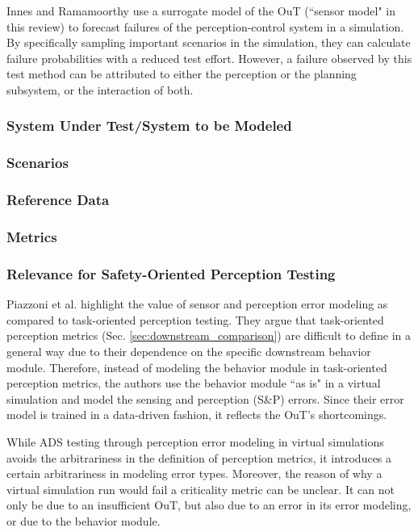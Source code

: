 \documentclass[conference]{IEEEtran}
\begin{document}
Innes and Ramamoorthy \cite{Innes2022testing} use a surrogate model of the OuT (``sensor model" in this review) to forecast failures of the perception-control system in a simulation. 
By specifically sampling important scenarios in the simulation, they can calculate failure probabilities with a reduced test effort. 
However, a failure observed by this test method can be attributed to either the perception or the planning subsystem, or the interaction of both. 


\subsubsection{System Under Test/System to be Modeled}
\subsubsection{Scenarios}


\subsubsection{Reference Data}
\subsubsection{Metrics}

\subsubsection{Relevance for Safety-Oriented Perception Testing}


\mbox{Piazzoni} et al. \cite{Piazzoni2023simulation} highlight the value of sensor and perception error modeling as compared to task-oriented perception testing. 
They argue that task-oriented perception metrics (Sec. \ref{sec:downstream_comparison}) are difficult to define in a general way due to their dependence on the specific downstream behavior module. 
Therefore, instead of modeling the behavior module in task-oriented perception metrics, the authors use the behavior module ``as is" in a virtual simulation and model the sensing and perception (S\&P) errors. 
Since their error model is trained in a data-driven fashion, it reflects the OuT's shortcomings. 

While ADS testing through perception error modeling in virtual simulations avoids the arbitrariness in the definition of perception metrics, it introduces a certain arbitrariness in modeling error types. 
Moreover, the reason of why a virtual simulation run would fail a criticality metric can be unclear.
It can not only be due to an insufficient OuT, but also due to an error in its error modeling, or due to the behavior module.
\end{document}
